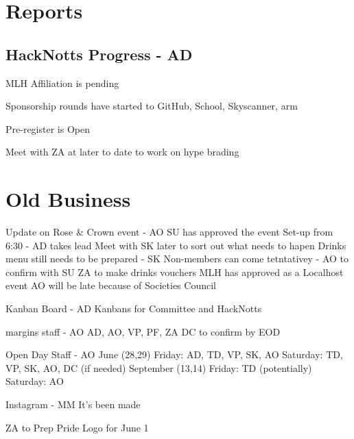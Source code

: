 \documentclass[11pt]{meetingmins}
\begin{document}
\maketitle

\section{Reports}

\subsection{HackNotts Progress - AD}
\begin{hiddensubitems}
	\item MLH Affiliation is pending
	\item Sponsorship rounds have started to GitHub, School, Skyscanner, arm
	\item Pre-register is Open
	\item Meet with ZA at later to date to work on hype brading
\end{hiddensubitems}

\section{Old Business}
\begin{items}
	\item Update on Rose \& Crown event - AO
		\subitem SU has approved the event
		\subitem Set-up from 6:30 - AD takes lead
		\subitem Meet with SK later to sort out what needs to hapen
		\subitem Drinks menu still needs to be prepared - SK
		\subitem Non-members can come tetntativey - AO to confirm with SU
		\subitem ZA to make drinks vouchers
		\subitem MLH has approved as a Localhost event
		\subitem AO will be late because of Societies Council
	\item Kanban Board - AD
		\subitem Kanbans for Committee and HackNotts
	\item margins staff - AO
		\subitem AD, AO, VP, PF, ZA
		\subitem DC to confirm by EOD
	\item Open Day Staff - AO
		\subitem June (28,29)
			\subsubitem Friday: AD, TD, VP, SK, AO
			\subsubitem Saturday: TD, VP, SK, AO, DC (if needed)
		\subitem September (13,14)
			\subsubitem Friday: TD (potentially)
			\subsubitem Saturday: AO
	\item Instagram - MM
		\subitem It's been made
	\item ZA to Prep Pride Logo for June 1
\end{items}
\end{document}
